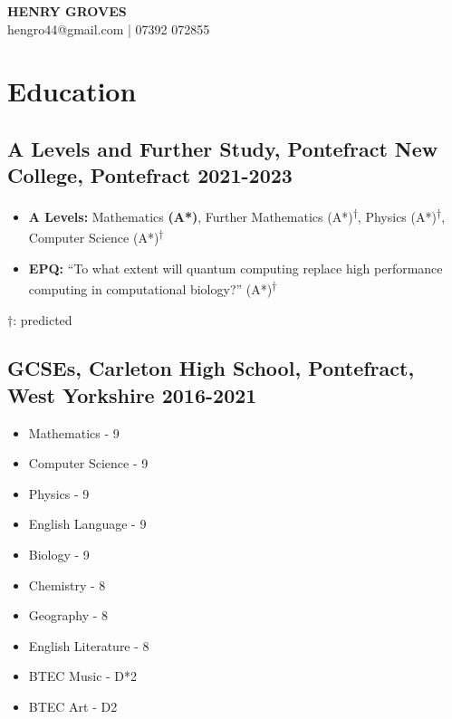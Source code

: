 \documentclass[9pt]{extarticle}
\makeatletter
\renewcommand{\maketitle}{
    \begin{center}
        {\huge\bfseries HENRY GROVES\\}
    \vspace{.5em}
    {\large hengro44@gmail.com | 07392 072855}
    \end{center}
}
\makeatother
\begin{document}
\thispagestyle{empty}
\maketitle

\begin{minipage}{0.97\textwidth}
	\section{Education}
	\subsection{A Levels and Further Study, Pontefract New College, Pontefract \hfill 2021-2023}
	\vspace{-0.2cm}
	\begin{itemize}
		\item {\bfseries A Levels:} Mathematics \textbf{(A*)}, Further Mathematics (A*)\textsuperscript{†}, Physics (A*)\textsuperscript{†}, Computer Science (A*)\textsuperscript{†}
		\item {\bfseries EPQ: } ``To what extent will quantum computing replace high performance computing in computational biology?'' (A*)\textsuperscript{†}
	\end{itemize}
	\vspace{-.2cm}
	\hspace{.5cm}\footnotesize{†: predicted}
	\normalsize
	\vspace{-.2cm}
	\subsection{GCSEs, Carleton High School, Pontefract, West Yorkshire \hfill 2016-2021}
	\vspace{-0.5cm}
	\begin{multicols}{3}
		\begin{itemize}
			\item {Mathematics - 9}
			\item {Computer Science - 9}
			\item {Physics - 9}
			\item {English Language - 9}
			\item {Biology - 9}
			\item {Chemistry - 8}
			\item {Geography - 8}
			\item {English Literature - 8}
			\item {BTEC Music - D*2}
			\item {BTEC Art - D2}
		\end{itemize}
	\end{multicols}

\end{minipage}
\vspace{.4cm}
\end{document}
